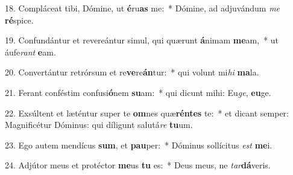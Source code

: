 18. Compláceat tibi, Dómine, ut \textbf{é}ru\textbf{as} me:~*  Dómine, ad adjuvándum \textit{me} \textbf{ré}spice.\

19. Confundántur et revereántur simul, qui quærunt \textbf{á}nimam \textbf{me}am,~*  ut áufe\textit{rant} \textbf{e}am.\

20. Convertántur retrórsum et re\textbf{ve}re\textbf{án}tur:~*  qui volunt mi\textit{hi} \textbf{ma}la.\

21. Ferant conféstim confusi\textbf{ó}nem \textbf{su}am:~*  qui dicunt mihi: Eu\textit{ge}, \textbf{eu}ge.\

22. Exsúltent et læténtur super te \textbf{om}nes quæ\textbf{rén}\textbf{tes} te:~*  et dicant semper: Magnificétur Dóminus: qui díligunt salutá\textit{re} \textbf{tu}um.\

23. Ego autem mendícus \textbf{sum}, et \textbf{pau}per:~*  Dóminus sollícitus \textit{est} \textbf{me}i.\

24. Adjútor meus et protéctor \textbf{me}us \textbf{tu} es:~*  Deus meus, ne \textit{tar}\textbf{dá}veris.\

